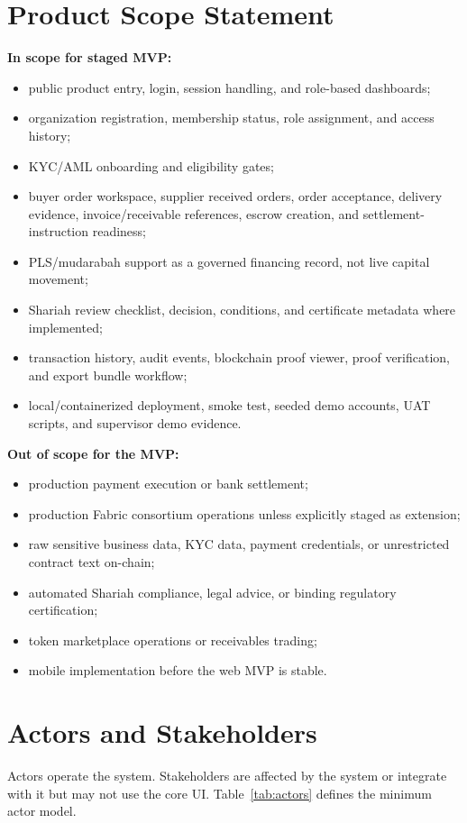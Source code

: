 \documentclass[conference]{IEEEtran}
\begin{document}
\section{Product Scope Statement}
\textbf{In scope for staged MVP:}
\begin{itemize}
  \item public product entry, login, session handling, and role-based dashboards;
  \item organization registration, membership status, role assignment, and access history;
  \item KYC/AML onboarding and eligibility gates;
  \item buyer order workspace, supplier received orders, order acceptance, delivery evidence, invoice/receivable references, escrow creation, and settlement-instruction readiness;
  \item PLS/mudarabah support as a governed financing record, not live capital movement;
  \item Shariah review checklist, decision, conditions, and certificate metadata where implemented;
  \item transaction history, audit events, blockchain proof viewer, proof verification, and export bundle workflow;
  \item local/containerized deployment, smoke test, seeded demo accounts, UAT scripts, and supervisor demo evidence.
\end{itemize}

\textbf{Out of scope for the MVP:}
\begin{itemize}
  \item production payment execution or bank settlement;
  \item production Fabric consortium operations unless explicitly staged as extension;
  \item raw sensitive business data, KYC data, payment credentials, or unrestricted contract text on-chain;
  \item automated Shariah compliance, legal advice, or binding regulatory certification;
  \item token marketplace operations or receivables trading;
  \item mobile implementation before the web MVP is stable.
\end{itemize}

\section{Actors and Stakeholders}
Actors operate the system. Stakeholders are affected by the system or integrate with it but may not use the core UI. Table~\ref{tab:actors} defines the minimum actor model.
\end{document}
